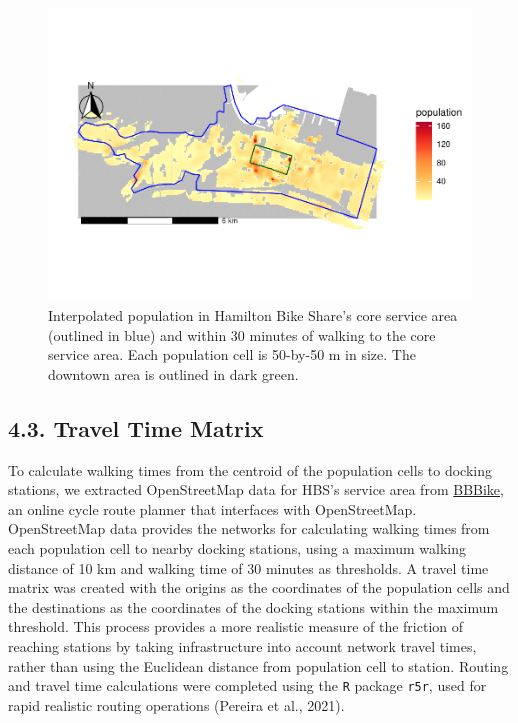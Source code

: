 \documentclass[]{elsarticle} %
\begin{document}
\begin{figure}

{\centering \includegraphics[width=0.9\linewidth]{Bike-share-spatial-equity_files/figure-latex/interpolated-population-1} 

}

\caption{Interpolated population in Hamilton Bike Share's core service area (outlined in blue) and within 30 minutes of walking to the core service area. Each population cell is 50-by-50 m in size. The downtown area is outlined in dark green.}\label{fig:interpolated-population}
\end{figure}

\hypertarget{travel-time-matrix}{%
\subsection{4.3. Travel Time Matrix}\label{travel-time-matrix}}

To calculate walking times from the centroid of the population cells to
docking stations, we extracted OpenStreetMap data for HBS's service area
from \href{https://download.bbbike.org/osm/bbbike/}{BBBike}, an online
cycle route planner that interfaces with OpenStreetMap. OpenStreetMap
data provides the networks for calculating walking times from each
population cell to nearby docking stations, using a maximum walking
distance of 10 km and walking time of 30 minutes as thresholds. A travel
time matrix was created with the origins as the coordinates of the
population cells and the destinations as the coordinates of the docking
stations within the maximum threshold. This process provides a more
realistic measure of the friction of reaching stations by taking
infrastructure into account network travel times, rather than using the
Euclidean distance from population cell to station. Routing and travel
time calculations were completed using the \texttt{R} package
\texttt{r5r}, used for rapid realistic routing operations (Pereira et
al., 2021).
\end{document}
